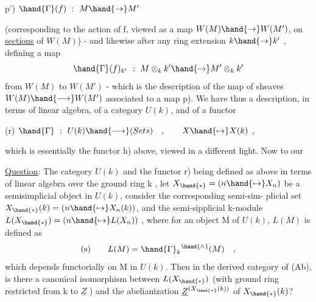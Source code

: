 
\hand{(}p') \qquad $\hand{\Gamma}(f) \ : \ M \hand{\to} M'$

(corresponding to the action of f, viewed as a map $W(M)\hand{\to} W(M')$, on
\uline{sections} of $W(M)$) - and likewise after any ring extension $k\hand{\to} k'$ ,
defining a map
\[ \hand{\Gamma}(f)_{k'} \ : \ M\otimes_k k' \hand{\to} M'\otimes_k k' \]
from $W(M)$ to $W(M')$ - which is the description of the map of sheaves
$W(M)\hand{\longrightarrow} W(M')$ associated to a map \hand{(}p). We have thus a description, in
terms of linear algebra, of a category $U(k)$, and of a  functor

(r) \qquad $\hand{\Gamma} \ : \ U(k) \hand{\longrightarrow} (Sets) \quad , \qquad X \hand{\mapsto} X(k)$ ,

which is essentially the functor \hand{(}h) above, viewed in a different light.
Now to our

\uline{Question}: \margin{\unsure{$\#$}}The category $U(k)$ and the functor r) being defined as above
in terms of linear algebra over the ground ring k , let $X_{\hand{*}} = (n\hand{\mapsto} X_n)$
be a semisimplicial object in $U(k)$, consider the corresponding semi-sim-%
plicial set $X_{\hand{*}}(k) = (n\hand{\mapsto} X_n(k))$, and the semi-sipplicial k-module
$L(X_{\hand{*}}) = (n\hand{\mapsto} L(X_n))$ , where for an object M of $U(k)$, $L(M)$ is defined as
\[ \text{(s)} \qquad L(M) = \hand{\Gamma}_k{}^{\hand{\wedge}}(M) \quad , \]
which depends functorially on M in $U(k)$. Then in the derived category
of (Ab), is there a canonical isomorphism between $L(X_{\hand{*}})$ (with ground
ring restricted from k to $\underline{Z}$ ) and the abelianization $\underline{Z}^{(X_{\hand{*}}(k))}$ of $X_{\hand{*}}(k)$?

